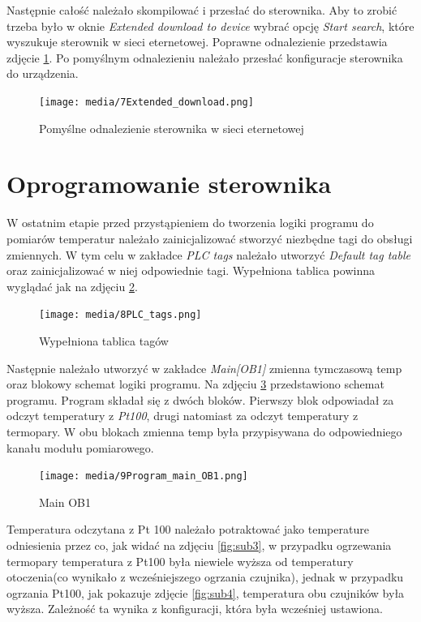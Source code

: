 \documentclass{article}
\begin{document}
\newpage
Następnie całość należało skompilować i przesłać do sterownika. 
Aby to zrobić trzeba było w oknie \textit{Extended download to device} wybrać opcję \textit{Start search}, które wyszukuje sterownik w sieci eternetowej. Poprawne odnalezienie przedstawia zdjęcie \ref{fig:Extdown}. Po pomyślnym odnalezieniu należało przesłać konfiguracje sterownika do urządzenia. 
\begin{figure}[H]
    \centering
    \texttt{[image: media/7Extended\_download.png]}
    \caption{Pomyślne odnalezienie sterownika w sieci eternetowej}
    \label{fig:Extdown}    
\end{figure}


\newpage
\section{Oprogramowanie sterownika}
W ostatnim etapie przed przystąpieniem do tworzenia logiki programu do pomiarów temperatur należało zainicjalizować stworzyć niezbędne tagi do obsługi zmiennych. W tym celu w zakładce \textit{PLC tags} należało utworzyć \textit{Default tag table} oraz zainicjalizować w niej odpowiednie tagi. Wypełniona tablica powinna wyglądać jak na zdjęciu \ref{fig:tagi}.

\begin{figure}[H]
    \centering
    \texttt{[image: media/8PLC\_tags.png]}
    \caption{Wypełniona tablica tagów}
    \label{fig:tagi}    
\end{figure}


\newpage
Następnie należało utworzyć w zakładce \textit{Main[OB1]} zmienna tymczasową temp oraz blokowy schemat logiki programu. Na zdjęciu \ref{fig:bloki} przedstawiono schemat programu. Program składał się z dwóch bloków. Pierwszy blok odpowiadał za odczyt temperatury z \textit{Pt100}, drugi natomiast za odczyt temperatury z termopary. W obu blokach zmienna temp była przypisywana do odpowiedniego kanału modułu pomiarowego.

\begin{figure}[H]
    \centering
    \texttt{[image: media/9Program\_main\_OB1.png]}
    \caption{Main OB1}
    \label{fig:bloki}    
\end{figure}


\newpage
Temperatura odczytana z Pt 100 należało potraktować jako temperature odniesienia przez co, jak widać na zdjęciu \ref{fig:sub3}, w przypadku ogrzewania termopary temperatura z Pt100 była niewiele wyższa od temperatury otoczenia(co wynikało z wcześniejszego ogrzania czujnika), jednak w przypadku ogrzania Pt100, jak pokazuje zdjęcie \ref{fig:sub4}, temperatura obu czujników była wyższa. Zależność ta wynika z konfiguracji, która była wcześniej ustawiona.
\end{document}
